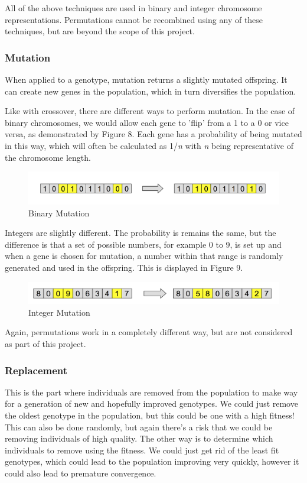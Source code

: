 \documentclass[12pt,a4paper]{article}
\begin{document}
All of the above techniques are used in binary and integer chromosome representations. Permutations cannot be recombined using any of these techniques, but are beyond the scope of this project. 

\subsubsection{Mutation}
When applied to a genotype, mutation returns a slightly mutated offspring\citep{IntroductionToEvolutionaryComputing}. It can create new genes in the population, which in turn diversifies the population. 

Like with crossover, there are different ways to perform mutation. In the case of binary chromosomes, we would allow each gene to 'flip' from a 1 to a 0 or vice versa, as demonstrated by Figure 8. Each gene has a probability of being mutated in this way, which will often be calculated as 1/\textit{n} with \textit{n} being representative of the chromosome length.


\begin{figure}[h]
	\centering
	\includegraphics[width = \textwidth]{BinaryMutation.png}
	\caption{Binary Mutation}
\end{figure}

Integers are slightly different. The probability is remains the same, but the difference is that a set of possible numbers, for example 0 to 9, is set up and when a gene is chosen for mutation, a number within that range is randomly generated and used in the offspring. This is displayed in Figure 9.\\

\begin{figure}[h]
	\centering
	\includegraphics[width = \textwidth]{IntegerMutation.png}
	\caption{Integer Mutation}
\end{figure}
 
Again, permutations work in a completely different way, but are not considered as part of this project. 

\subsubsection{Replacement}
This is the part where individuals are removed from the population to make way for a generation of new and hopefully improved genotypes. We could just remove the oldest genotype in the population, but this could be one with a high fitness! This can also be done randomly, but again there's a risk that we could be removing individuals of high quality. The other way is to determine which individuals to remove using the fitness. We could just get rid of the least fit genotypes, which could lead to the population improving very quickly, however it could also lead to premature convergence.\\
\end{document}
